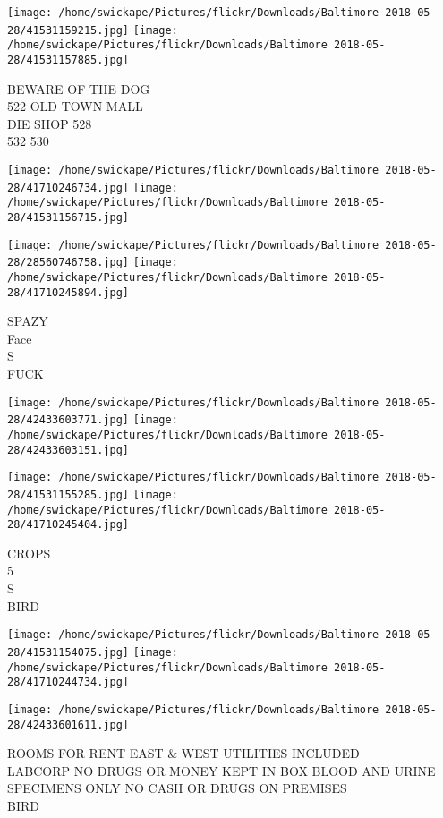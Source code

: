 \documentclass[10pt,letterpaper]{article}
\begin{document}
\texttt{[image: /home/swickape/Pictures/flickr/Downloads/Baltimore 2018-05-28/41531159215.jpg]}
\texttt{[image: /home/swickape/Pictures/flickr/Downloads/Baltimore 2018-05-28/41531157885.jpg]}

BEWARE OF THE DOG\\
522 OLD TOWN MALL\\
DIE SHOP 528\\
532 530
\pagebreak

\texttt{[image: /home/swickape/Pictures/flickr/Downloads/Baltimore 2018-05-28/41710246734.jpg]}
\texttt{[image: /home/swickape/Pictures/flickr/Downloads/Baltimore 2018-05-28/41531156715.jpg]}

\texttt{[image: /home/swickape/Pictures/flickr/Downloads/Baltimore 2018-05-28/28560746758.jpg]}
\texttt{[image: /home/swickape/Pictures/flickr/Downloads/Baltimore 2018-05-28/41710245894.jpg]}

SPAZY\\
Face\\
S\\
FUCK
\pagebreak

\texttt{[image: /home/swickape/Pictures/flickr/Downloads/Baltimore 2018-05-28/42433603771.jpg]}
\texttt{[image: /home/swickape/Pictures/flickr/Downloads/Baltimore 2018-05-28/42433603151.jpg]}

\texttt{[image: /home/swickape/Pictures/flickr/Downloads/Baltimore 2018-05-28/41531155285.jpg]}
\texttt{[image: /home/swickape/Pictures/flickr/Downloads/Baltimore 2018-05-28/41710245404.jpg]}

CROPS\\
5\\
S\\
BIRD
\pagebreak

\texttt{[image: /home/swickape/Pictures/flickr/Downloads/Baltimore 2018-05-28/41531154075.jpg]}
\texttt{[image: /home/swickape/Pictures/flickr/Downloads/Baltimore 2018-05-28/41710244734.jpg]}

\texttt{[image: /home/swickape/Pictures/flickr/Downloads/Baltimore 2018-05-28/42433601611.jpg]}

ROOMS FOR RENT EAST \& WEST UTILITIES INCLUDED\\
LABCORP NO DRUGS OR MONEY KEPT IN BOX BLOOD AND URINE SPECIMENS ONLY NO CASH OR DRUGS ON PREMISES\\
BIRD
\pagebreak
\end{document}
